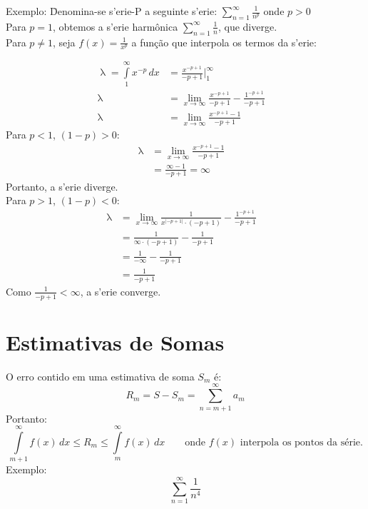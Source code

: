 \documentclass{article}
\begin{document}
\begin{tabbing}
  Exemplo: \=Denomina-se s\a'erie-P a seguinte s\a'erie: $\sum\limits_{n=1}^\infty \frac{1}{n^p}$ onde $p > 0$ \\[5pt]
  \> Para $p = 1$, obtemos a s\a'erie harm\^onica $\sum\limits_{n=1}^\infty \frac{1}{n}$, que diverge. \\[5pt]
  \> Para $p \neq 1$, seja $f(x) = \frac{1}{x^p}$ a fun\c{c}\~ao que interpola os termos da s\a'erie: \\
  \>\begin{minipage}{1\textwidth}
      \begin{align*}
        \uplambda = \int\limits_1^\infty x^{-p}\,dx &= \frac{x^{-p+1}}{-p+1} \Bigg|_1^\infty & \\[5pt]
        \uplambda &= \lim_{x\to\infty} \frac{x^{-p+1}}{-p+1} - \frac{1^{-p+1}}{-p+1} \\[5pt]
        \uplambda &= \lim_{x\to\infty} \frac{x^{-p+1} - 1}{-p+1}
      \end{align*}
      Para $p<1$, $(1-p) > 0$:
      \begin{align*}
        \uplambda &= \lim_{x\to\infty} \frac{x^{-p+1} - 1}{-p+1} &\\[5pt]
        &= \frac{\infty - 1}{-p+1} = \infty
      \end{align*}
      \qquad Portanto, a s\a'erie diverge. \\[5pt]
      Para $p>1$, $(1-p) < 0$:
      \begin{align*}
        \uplambda &= \lim_{x\to\infty} \frac{1}{x^{|-p+1|} \cdot (-p+1)} - \frac{1^{-p+1}}{-p+1} &\\[5pt]
        &= \frac{1}{\infty \cdot (-p + 1)} - \frac{1}{-p + 1} \\[5pt]
        &= \frac{1}{-\infty} - \frac{1}{-p + 1} \\[5pt]
        &= \frac{1}{-p + 1}
      \end{align*}
      \qquad Como $\frac{1}{-p+1} < \infty$, a s\a'erie converge.
    \end{minipage}
\end{tabbing}



\newpage
\section{Estimativas de Somas}

O erro contido em uma estimativa de soma $S_m$ \'e:
\[ R_m = S - S_m = \sum_{n=m+1}^\infty a_m \]
Portanto:
\[ \int\limits_{m+1}^\infty f(x)\,dx \leq R_m \leq \int\limits_m^\infty f(x)\,dx \qquad \text{onde $f(x)$ interpola os pontos da s\'erie.} \]
Exemplo:
\[ \sum_{n=1}^\infty \frac{1}{n^4} \] \\[-10pt]
\end{document}
